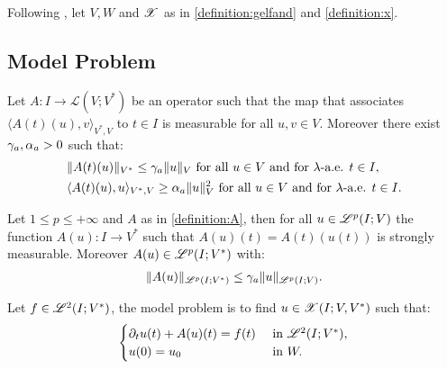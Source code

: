 Following \cite[p. 124]{Ern2021}, let $V, W$ and $\mathscr{X}$ as in \ref{definition:gelfand} and \ref{definition:x}.

\subsection{Model Problem}

\begin{definition}[A] \label{definition:A} %
    Let $A \colon I \rightarrow \mathcal{L}(V;V^*)$ be an operator such that the map that associates $\langle A(t)(u), v \rangle_{V^*, V}$ to $t \in I$ is measurable for all $u, v \in V$. Moreover there exist $\gamma_{a}, \alpha_{a} > 0$ such that:
    \begin{align} \label{equation:a}
        & \lVert A(t)(u) \rVert_{V^*} \leq \gamma_{a} \lVert u \rVert_V \text{ for all } u \in V \text{ and for } \lambda \text{-a.e. } t \in I, \\
        & \langle A(t)(u), u \rangle_{V^*, V} \geq \alpha_{a} \lVert u \rVert_V^2 \text{ for all } u \in V \text{ and for } \lambda \text{-a.e. } t \in I.
    \end{align}
\end{definition}

\begin{lemma}
    Let $1 \leq p \leq +\infty$ and  $A$ as in \ref{definition:A}, then for all $u \in \mathscr{L}^{p}(I; V)$ the function $A(u) \colon I \rightarrow V^*$ such that $A(u)(t) = A(t)(u(t))$ is strongly measurable. Moreover $A(u) \in \mathscr{L}^{p}(I; V^*)$ with:
    \begin{gather}
        \lVert A(u) \rVert_{\mathscr{L}^{p}(I; V^*)} \leq \gamma_{a} \lVert u \rVert_{\mathscr{L}^{p}(I; V)}.
    \end{gather}
\end{lemma}

\begin{definition}
    Let $f \in \mathscr{L}^{2}(I; V^*)$, the model problem is to find $u \in \mathscr{X}(I; V, V^*)$ such that:
    \begin{gather}
        \begin{cases} \label{equation:model}
            \partial_t u(t) + A(u)(t) = f(t) & \text{ in } \mathscr{L}^{2}(I; V^*), \\
            u(0) = u_0 & \text{ in } W.
        \end{cases}
    \end{gather}
\end{definition}

